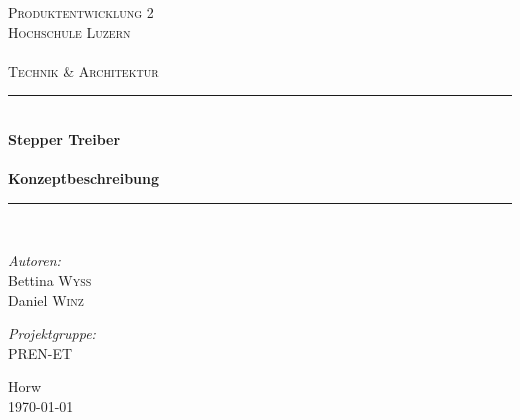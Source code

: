 \begin{titlepage}

\begin{center}

\textsc{\LARGE Produktentwicklung 2}\\[1.5cm]

\textsc{\Large Hochschule Luzern\\
    ~\\
    Technik \& Architektur}\\[0.5cm]

\vfill{}

\newcommand{\HRule}{\rule{\linewidth}{0.5mm}}
\HRule \\[0.4cm]
{   \Huge \bfseries Stepper Treiber\\
        ~\\
        \large Konzeptbeschreibung}\\[0.4cm]

\HRule \\[1.5cm]

\begin{minipage}[t]{0.4\textwidth}
    \begin{flushleft} \large
        \emph{Autoren:}\\
        Bettina \textsc{Wyss}\\
        Daniel \textsc{Winz}\\
    \end{flushleft}
\end{minipage}
\hfill
\begin{minipage}[t]{0.4\textwidth}
    \begin{flushright} \large
        \emph{Projektgruppe:} \\
        PREN-ET
    \end{flushright}
\end{minipage}

\vfill{}
\vfill{}
\vfill{}

{\large Horw\\ \today}

\end{center}

\end{titlepage}
